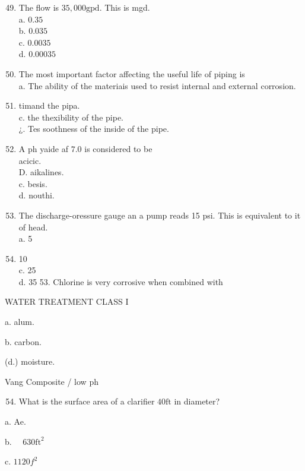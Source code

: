 \documentclass[10pt]{article}
\begin{document}
\begin{enumerate}
  \setcounter{enumi}{48}
  \item The flow is $35,000 \mathrm{gpd}$. This is mgd.\\
a. $0.35$\\
b. $0.035$\\
c. $0.0035$\\
d. $0.00035$

  \item The most important factor affecting the useful life of piping is\\
a. The ability of the materiais used to resist internal and external corrosion.

  \item timand the pipa.\\
c. the thexibility of the pipe.\\
¿. Tes soothness of the inside of the pipe.

  \item A ph yaide af $7.0$ is considered to be\\acicic.\\
D. aikalines.\\
c. besis.\\
d. nouthi.

  \item The discharge-oressure gauge an a pump reads 15 psi. This is equivalent to it of head.\\
a. 5

  \item 10\\
c. 25\\
d. 35 53. Chlorine is very corrosive when combined with

\end{enumerate}

WATER TREATMENT CLASS I

a. alum.

b. carbon.

(d.) moisture.

Vang Composite / low ph

\begin{enumerate}
  \setcounter{enumi}{53}
  \item What is the surface area of a clarifier $40 \mathrm{ft}$ in diameter?
\end{enumerate}

a. Ae.

b. $\quad 630 \mathrm{ft}^{2}$

c. $1120 f^{2}$
\end{document}
